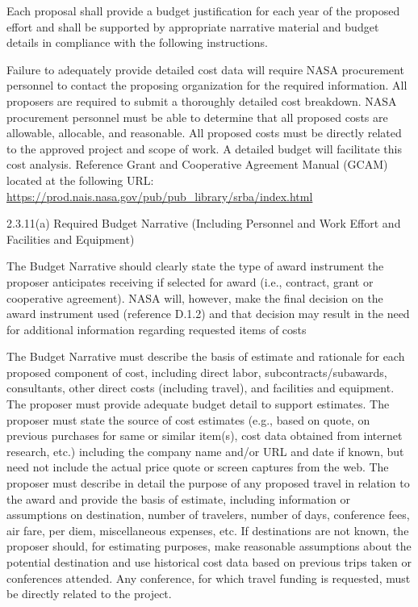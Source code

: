 \documentclass[12pt]{article}
\begin{document}
Each proposal shall provide a budget justification for each year of
the proposed effort and shall be supported by appropriate narrative
material and budget details in compliance with the following
instructions.

Failure to adequately provide detailed cost data will require NASA
procurement personnel to contact the proposing organization for the
required information. All proposers are required to submit a
thoroughly detailed cost breakdown. NASA procurement personnel must be
able to determine that all proposed costs are allowable, allocable,
and reasonable. All proposed costs must be directly related to the
approved project and scope of work. A detailed budget will facilitate
this cost analysis. Reference Grant and Cooperative Agreement Manual
(GCAM) located at the following URL:
\url{https://prod.nais.nasa.gov/pub/pub_library/srba/index.html}

2.3.11(a) Required Budget Narrative (Including Personnel and Work
Effort and Facilities and Equipment)

The Budget Narrative should clearly state the type of award instrument
the proposer anticipates receiving if selected for award (i.e.,
contract, grant or cooperative agreement). NASA will, however, make
the final decision on the award instrument used (reference D.1.2) and
that decision may result in the need for additional information
regarding requested items of costs

The Budget Narrative must describe the basis of estimate and rationale
for each proposed component of cost, including direct labor,
subcontracts/subawards, consultants, other direct costs (including
travel), and facilities and equipment. The proposer must provide
adequate budget detail to support estimates. The proposer must state
the source of cost estimates (e.g., based on quote, on previous
purchases for same or similar item(s), cost data obtained from
internet research, etc.) including the company name and/or URL and
date if known, but need not include the actual price quote or screen
captures from the web. The proposer must describe in detail the
purpose of any proposed travel in relation to the award and provide
the basis of estimate, including information or assumptions on
destination, number of travelers, number of days, conference fees, air
fare, per diem, miscellaneous expenses, etc. If destinations are not
known, the proposer should, for estimating purposes, make reasonable
assumptions about the potential destination and use historical cost
data based on previous trips taken or conferences attended. Any
conference, for which travel funding is requested, must be directly
related to the project.
\end{document}

